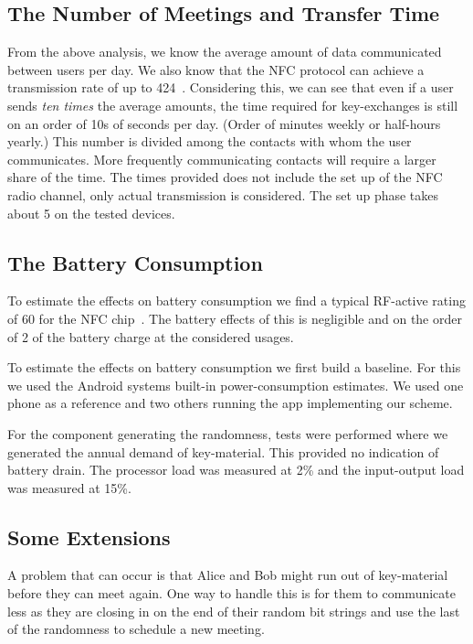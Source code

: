 \subsection{The Number of Meetings and Transfer Time}
\label{NumberOfMeetings}
From the above analysis, we know the average amount of data communicated 
between users per day.
We also know that the \ac{NFC} protocol can achieve a transmission rate of up 
to \unit{424}{\kilo\bit\per\second}~\cite{NFCController}.
Considering this, we can see that even if a user sends \emph{ten times} the 
average amounts, the time required for key-exchanges is still on an order of 
10s of seconds per day.
(Order of minutes weekly or half-hours yearly.)
This number is divided among the contacts with whom the user communicates.
More frequently communicating contacts will require a larger share of the time.
The times provided does not include the set up of the \ac{NFC} radio channel, 
only actual transmission is considered.
The set up phase takes about \unit{5}{\second} on the tested devices.

\subsection{The Battery Consumption}
\label{BatteryConsumption}
To estimate the effects on battery consumption we find a typical RF-active 
rating of \unit{60}{\milli\ampere} for the NFC chip~\cite{NFCController}.
The battery effects of this is negligible and on the order of 
\unit{2}{\text{\textperthousand}} of the battery charge at the considered 
usages.

To estimate the effects on battery consumption we first build a baseline.
For this we used the Android systems built-in power-consumption estimates.
We used one phone as a reference and two others running the app implementing 
our scheme.

For the component generating the randomness, tests were performed where we 
generated the annual demand of key-material.
This provided no indication of battery drain.
The processor load was measured at \unit{2}{\%} and the input-output load was 
  measured at \unit{15}{\%}. 

\subsection{Some Extensions}

A problem that can occur is that Alice and Bob might run out of key-material 
before they can meet again.
One way to handle this is for them to communicate less as they are closing in 
on the end of their random bit strings and use the last of the randomness to 
schedule a new meeting.

